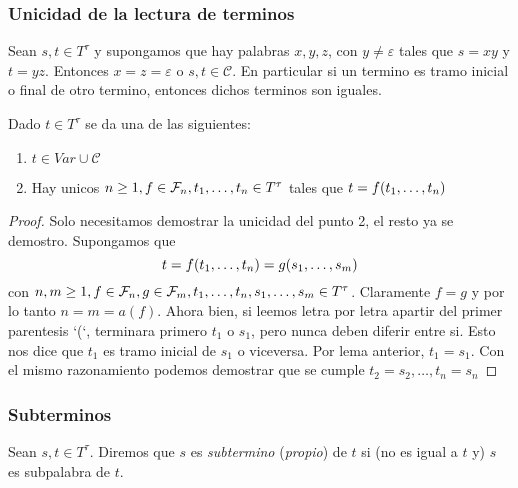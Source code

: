 \subsubsection{Unicidad de la lectura de terminos}

\begin{lemma}
  Sean $s, t \in T^\tau$ y supongamos que hay palabras $x, y, z$, con $y \neq \varepsilon$ tales que $s = xy$ y $t = yz$. Entonces 
  $x = z = \varepsilon$ o $s, t \in \mathcal{C}$. En particular si un termino es tramo inicial o final de otro termino, entonces dichos terminos son iguales.
\end{lemma}
\noproof

\begin{theorem}
  Dado $t \in T^\tau$ se da una de las siguientes:
  \begin{enumerate}
    \item $t \in Var \cup \mathcal{C}$
    \item Hay unicos $n \geq 1, f \in \mathcal{F}_n, t_{1}, \dots, t_{n} \in T^\tau$ tales que $t = f(t_{1}, \dots, t_{n})$
  \end{enumerate}
\end{theorem}
\begin{proof}
  Solo necesitamos demostrar la unicidad del punto 2, el resto ya se demostro. Supongamos que
  $$
  t=f(t_{1}, \dots, t_{n})=g(s_{1}, \dots, s_{m})
  $$
  con $n,m\geq1,f\in\mathcal{F}_n,g\in\mathcal{F}_m,t_{1}, \dots, t_{n},s_{1}, \dots, s_{m}\in T^\tau$. Claramente $f=g$ y por lo tanto $n=m=a(f)$.
  Ahora bien, si leemos letra por letra apartir del primer parentesis `(`, terminara primero $t_1$ o $s_1$, pero nunca deben diferir entre si. Esto nos dice
  que $t_1$ es tramo inicial de $s_1$ o viceversa. Por lema anterior, $t_1=s_1$. Con el mismo razonamiento podemos demostrar que se cumple 
  $t_2=s_2,\dots,t_n=s_n$
\end{proof}

\subsubsection{Subterminos}

\begin{definition}
  Sean $s, t \in T^\tau$. Diremos que $s$ es \emph{subtermino} (\emph{propio}) de $t$ si (no es igual a $t$ y) $s$ es subpalabra de $t$.
\end{definition}

